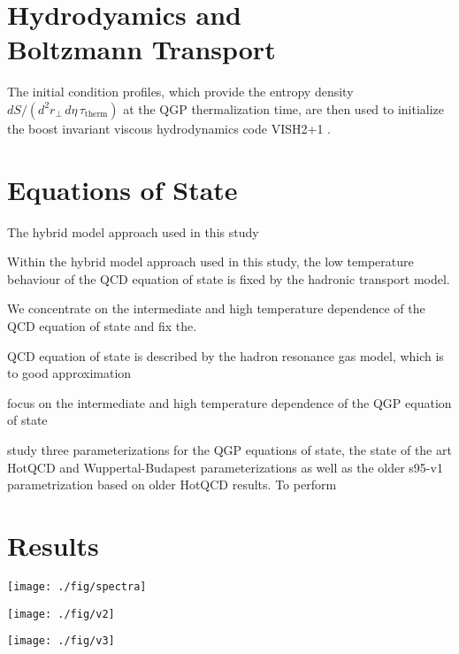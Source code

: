 \documentclass[aps,prc,reprint,amsmath,nofootinbib,superscriptaddress]{revtex4-1}
\begin{document}
\section{Hydrodyamics and \\ Boltzmann Transport}

The initial condition profiles, which provide the entropy density $dS/(d^2r_\perp\, d\eta\, \tau_\text{therm})$ at the QGP thermalization time, are then used to initialize the boost invariant viscous hydrodynamics code 
{\ttfamily VISH2+1} \cite{?}. 

\section{Equations of State}

The hybrid model approach used in this study 

Within the hybrid model approach used in this study, the low temperature behaviour of the QCD equation of state is fixed by the hadronic transport model.

We concentrate on the intermediate and high temperature dependence of the QCD equation of state and fix the.


QCD equation of state is described by the hadron 
resonance gas model, which is to good approximation



focus on the intermediate and high temperature dependence of the QGP equation of state


study three parameterizations for the QGP equations of state, the state of the art HotQCD and Wuppertal-Budapest parameterizations \cite{?} as well as the older s95-v1 parametrization based on 
older HotQCD results. To perform


\section{Results}

\begin{figure*}[t]
  \texttt{[image: ./fig/spectra]}
  \caption{
    \label{fig:spectra}
  }
\end{figure*}

\begin{figure*}[t]
  \texttt{[image: ./fig/v2]}
  \caption{
    \label{fig:spectra}
  }
\end{figure*}

\begin{figure*}[t]
  \texttt{[image: ./fig/v3]}
  \caption{
    \label{fig:spectra}
  }
\end{figure*}
\end{document}

